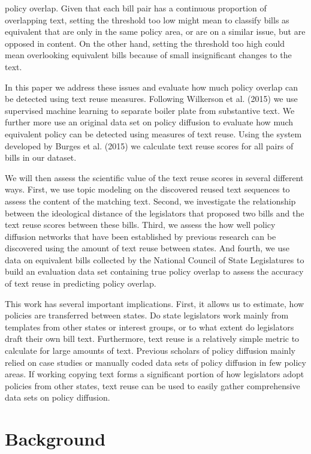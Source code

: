 \documentclass[12pt]{article} %
\begin{document}
policy overlap. Given that each bill pair has a continuous proportion of
overlapping text, setting the threshold too low might mean to classify bills as
equivalent that are only in the same policy area, or are on a similar issue, but
are opposed in content. On the other hand, setting the threshold too high could
mean overlooking equivalent bills because of small insignificant changes to the
text. 

In this paper we address these issues and evaluate how much policy overlap can
be detected using text reuse measures. Following Wilkerson et al. (2015) we use
supervised machine learning to separate boiler plate from substantive text. We
further more use an original data set on policy diffusion to evaluate how much
equivalent policy can be detected using measures of text reuse. Using the system
developed by Burges et al. (2015) we calculate text reuse scores for all pairs
of bills in our dataset. 

We will then assess the scientific value of the text reuse scores in several different ways. First, we use topic modeling on the discovered reused text sequences to assess the content of the matching text. Second, we investigate the relationship between the ideological distance of the legislators that proposed two bills and the text reuse scores between these bills. Third, we assess the how well policy diffusion networks that have been established by previous research can be discovered using the amount of text reuse between states. And fourth, we use data on equivalent bills collected by the National Council of State Legislatures to build an evaluation data set containing true policy overlap to assess the accuracy of text reuse in predicting policy overlap.

This work has several important implications. First, it allows us to estimate,
how policies are transferred between states. Do state legislators work mainly
from templates from other states or interest groups, or to what extent do
legislators draft their own bill text. Furthermore, text reuse is a relatively
simple metric to calculate for large amounts of text. Previous scholars of
policy diffusion mainly relied on case studies or manually coded data sets of
policy diffusion in few policy areas. If working copying text forms a
significant portion of how legislators adopt policies from other states, text
reuse can be used to easily gather comprehensive data sets on policy diffusion. 


\section{Background}
\end{document}
